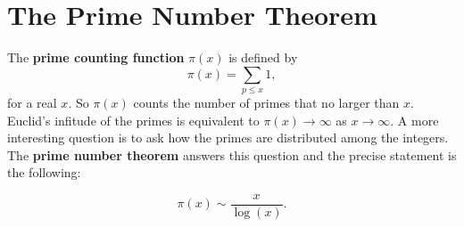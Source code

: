     \section{The Prime Number Theorem}
      The \textbf{prime counting function} $\pi(x)$ is defined by
      \[
        \pi(x) = \sum_{p \le x}1,
      \]
      for a real $x$. So $\pi(x)$ counts the number of primes that no larger than $x$. Euclid's infitude of the primes is equivalent to $\pi(x) \to \infty$ as $x \to \infty$. A more interesting question is to ask how the primes are distributed among the integers. The \textbf{prime number theorem} answers this question and the precise statement is the following:

      \begin{theorem}
        \phantom{ }
        \[
          \pi(x) \sim \frac{x}{\log(x)}.
        \]
      \end{theorem}

